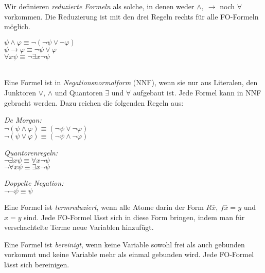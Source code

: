 \documentclass[a4paper,parskip=half*,DIV=15,fontsize=11pt]{scrartcl}
\begin{document}

\begin{minipage}{0.55\textwidth}
Wir definieren \emph{reduzierte Formeln} als solche, in denen weder $\land,\ \rightarrow$ noch $\forall$ vorkommen. Die Reduzierung ist mit den drei Regeln rechts für alle FO-Formeln möglich.
\end{minipage}
\begin{minipage}{0.4\textwidth}
\centering
$\psi \land \varphi \equiv \neg (\neg \psi \lor \neg \varphi)$ \\
$\psi \rightarrow \varphi \equiv \neg \psi \lor \varphi$ \\
$\forall x \psi \equiv \neg \exists x \neg \psi$
\end{minipage}
\ \\

Eine Formel ist in \emph{Negationsnormalform} (NNF), wenn sie nur aus Literalen, den Junktoren $\lor$, $\land$ und Quantoren $\exists$ und $\forall$ aufgebaut ist. Jede Formel kann in NNF gebracht werden. Dazu reichen die folgenden Regeln aus:

\begin{minipage}[t]{0.33\textwidth}
\centering
\emph{De Morgan:}   \\
$\neg (\psi \land \varphi) \equiv (\neg \psi \lor \neg \varphi)$    \\
$\neg (\psi \lor \varphi) \equiv (\neg \psi \land \neg \varphi)$
\end{minipage}
\begin{minipage}[t]{0.33\textwidth}
\centering
\emph{Quantorenregeln:} \\
$\neg \exists x \psi \equiv \forall x \neg \psi$    \\
$\neg \forall x \psi \equiv \exists x \neg \psi$
\end{minipage}
\begin{minipage}[t]{0.33\textwidth}
\centering
\emph{Doppelte Negation:}   \\
$\neg \neg \psi \equiv \psi$
\end{minipage}
\medskip

Eine Formel ist \emph{termreduziert}, wenn alle Atome darin der Form $R \overline{x},\ f \overline{x} = y$ und $x = y$ sind. Jede FO-Formel lässt sich in diese Form bringen, indem man für verschachtelte Terme neue Variablen hinzufügt.

Eine Formel ist \emph{bereinigt}, wenn keine Variable sowohl frei als auch gebunden vorkommt und keine Variable mehr als einmal gebunden wird. Jede FO-Formel lässt sich bereinigen.
\end{document}
